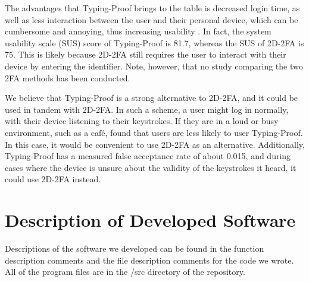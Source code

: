 \documentclass[11pt]{article}
\begin{document}
The advantages that Typing-Proof brings to the table is decreased login
time, as well as less interaction between the user and their personal
device, which can be cumbersome and annoying, thus increasing usability
\cite{liuTypingProof}. In fact, the system usability scale (SUS) score
of Typing-Proof is 81.7, whereas the SUS of 2D-2FA is 75. This is likely
because 2D-2FA still requires the user to interact with their device by
entering the identifier. Note, however, that no study comparing the two
2FA methods has been conducted.  

We believe that Typing-Proof is a strong alternative to 2D-2FA, and it
could be used in tandem with 2D-2FA. In such a scheme, a user might
log in normally, with their device listening to their keystrokes. If
they are in a loud or busy environment, such as a caf\'e,
\cite{liuTypingProof} found that users are less likely to user
Typing-Proof. In this case, it would be convenient to use 2D-2FA as an
alternative. Additionally, Typing-Proof has a measured false acceptance
rate of about 0.015, and during cases where the device is unsure about
the validity of the keystrokes it heard, it could use 2D-2FA instead.





\appendix
\section{Description of Developed Software}

Descriptions of the software we developed can be found in the function
description comments and the file description comments for the code we
wrote. All of the program files are in the /src directory of the
repository. 
\end{document}
